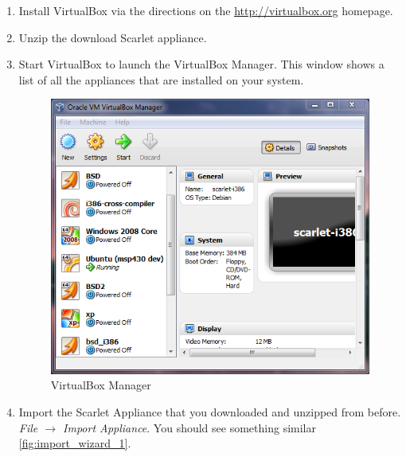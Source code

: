 \documentclass[pdftex,11pt,letterpaper]{article}
\begin{document}
\begin{enumerate}
  \item Install VirtualBox via the directions on the \url{http://virtualbox.org} homepage.
\item Unzip the download Scarlet appliance.
\item Start VirtualBox to launch the VirtualBox Manager.  This window shows a list of all the appliances that are installed on your system.

  \begin{figure}[H]
    \begin{center}
      \leavevmode
      \includegraphics[]{scarlet_images/virtual_box.png}
    \end{center}
    \caption{VirtualBox Manager}
    \label{fig:virtualbox_manager}
  \end{figure}

\item Import the Scarlet Appliance that you downloaded and unzipped from before.  \textit{File $\rightarrow$ Import Appliance}.  You should see something similar \ref{fig:import_wizard_1}.


\end{enumerate}
\end{document}
